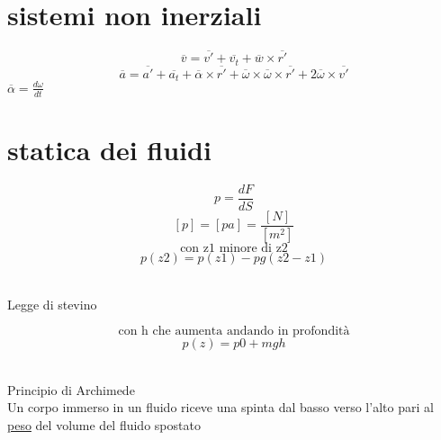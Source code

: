 \documentclass{article}
\begin{document}
\section{sistemi non inerziali}
\[\overline{v}=\overline{v'}+\overline{v_t}+\overline{w}\times\overline{r'}\]
\[\overline{a}=\overline{a'}+\overline{a_t}+\overline{\alpha}\times\overline{r'}+\overline{\omega}\times\overline{\omega}\times\overline{r'}+2\overline{\omega}\times\overline{v'}\]
\(\overline{\alpha}=\frac{d\omega}{dt}\)

\section{statica dei fluidi}

\[p=\frac{dF}{dS}\] 
\[[p]=[pa]=\frac{[N]}{[m^2]}\]
\[\text{con z1 minore di z2}\]
\[p(z2) = p(z1) - pg(z2-z1)\]\\
\begin{center}
	\LARGE{Legge di stevino}
\end{center}
\[\text{con h che aumenta andando in profondità}\]
\[p(z) = p0 + mgh\]\\
\begin{center}
	\LARGE{Principio di Archimede}\\
	\Large{Un corpo immerso in un fluido riceve una spinta dal basso verso l'alto pari al \underline{peso} del volume del fluido spostato}
\end{center}
\end{document}
